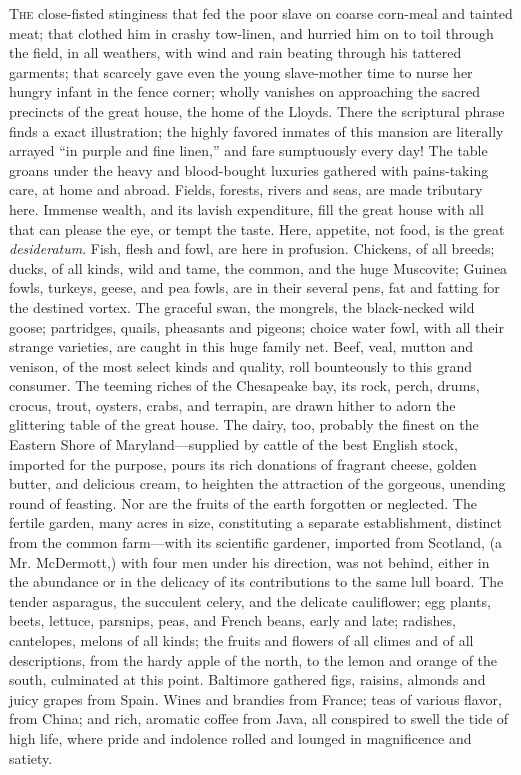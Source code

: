 \textsc{The} close-fisted stinginess that fed the poor slave on coarse
corn-meal and tainted meat; that clothed him in crashy tow-linen, and
hurried him on to toil through the field, in all weathers, with wind and
rain beating through his tattered garments; that scarcely gave even the
young slave-mother time to nurse her hungry infant in the fence corner;
wholly vanishes on approaching the sacred precincts of the great house,
the home of the Lloyds. There the scriptural phrase finds a exact
illustration; the highly favored inmates of this mansion are literally
arrayed ``in purple and fine linen,'' and fare sumptuously every day!
The table groans under the heavy and blood-bought luxuries gathered with
pains-taking care, at home and abroad. Fields, forests, rivers and seas,
are made tributary here. Immense wealth, and its lavish expenditure,
fill the great house with all that can please the
{\protect\hypertarget{108}{}{}}eye, or tempt the taste. Here, appetite,
not food, is the great \emph{desideratum}. Fish, flesh and fowl, are
here in profusion. Chickens, of all breeds; ducks, of all kinds, wild
and tame, the common, and the huge Muscovite; Guinea fowls, turkeys,
geese, and pea fowls, are in their several pens, fat and fatting for the
destined vortex. The graceful swan, the mongrels, the black-necked wild
goose; partridges, quails, pheasants and pigeons; choice water fowl,
with all their strange varieties, are caught in this huge family net.
Beef, veal, mutton and venison, of the most select kinds and quality,
roll bounteously to this grand consumer. The teeming riches of the
Chesapeake bay, its rock, perch, drums, crocus, trout, oysters, crabs,
and terrapin, are drawn hither to adorn the glittering table of the
great house. The dairy, too, probably the finest on the Eastern Shore of
Maryland---supplied by cattle of the best English stock, imported for
the purpose, pours its rich donations of fragrant cheese, golden butter,
and delicious cream, to heighten the attraction of the gorgeous,
unending round of feasting. Nor are the fruits of the earth forgotten or
neglected. The fertile garden, many acres in size, constituting a
separate establishment, distinct from the common farm---with its
scientific gardener, imported from Scotland, (a Mr. McDermott,) with
four men under his direction, was not behind, either in the abundance or
in the delicacy of its contributions to the same lull board. The tender
asparagus, the succulent celery, and the delicate cauliflower; egg
plants, beets, lettuce, parsnips, peas, and French beans, early and
late; radishes, cantelopes, melons of all kinds; the fruits and flowers
of all {\protect\hypertarget{109}{}{}}climes and of all descriptions,
from the hardy apple of the north, to the lemon and orange of the south,
culminated at this point. Baltimore gathered figs, raisins, almonds and
juicy grapes from Spain. Wines and brandies from France; teas of various
flavor, from China; and rich, aromatic coffee from Java, all conspired
to swell the tide of high life, where pride and indolence rolled and
lounged in magnificence and satiety.

